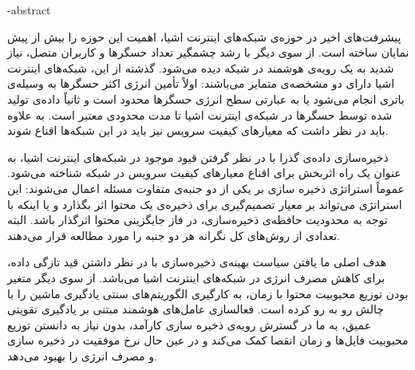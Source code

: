 \fa-abstract{
پیشرفت‌های اخیر در حوزه‌ی شبکه‌های اینترنت اشیا، اهمیت این حوزه را بیش از پیش نمایان ساخته است. از سوی دیگر با رشد چشمگیر تعداد حسگرها و کاربران متصل، نیاز شدید به یک رویه‌ی هوشمند در شبکه دیده می‌شود. گذشته از این، شبکه‌های اینترنت اشیا دارای دو مشخصه‌ی متمایز می‌باشند: اولاً تأمین انرژی اکثر حسگرها به وسیله‌ی باتری انجام می‌شود یا به عبارتی سطح انرژی حسگرها محدود است و ثانیاً داده‌ی تولید شده توسط حسگرها در شبکه‌ی اینترنت اشیا تا مدت محدودی معتبر است. به علاوه باید در نظر داشت که معیارهای کیفیت سرویس نیز باید در این شبکه‌ها اقناع شوند.

ذخیره‌سازی داده‌ی گذرا با در نظر گرفتن قیود موجود در شبکه‌های اینترنت اشیا، به عنوان یک راه اثربخش برای اقناع معیارهای کیفیت سرویس در شبکه شناخته می‌شود. عموماً استراتژی ذخیره سازی بر یکی از دو جنبه‌ی متفاوت مسئله‌ اعمال می‌شوند: این استراتژی می‌تواند بر معیار تصمیم‌گیری برای ذخیره‌ی یک محتوا اثر بگذارد و یا اینکه با توجه به محدودیت حافظه‌ی ذخیره‌سازی، در فاز جایگزینی محتوا اثرگذار باشد. البته تعدادی از روش‌های کل نگرانه هر دو جنبه را مورد مطالعه قرار می‌دهند. 

هدف اصلی ما یافتن سیاست بهینه‌ی ذخیره‌سازی با در نظر داشتن قید تازگی داده، برای کاهش مصرف انرژی در شبکه‌های اینترنت اشیا می‌باشد. از سوی دیگر متغیر بودن توزیع محبوبیت محتوا با زمان،  به کارگیری الگوریتم‌های سنتی یادگیری ماشین را با چالش رو به رو کرده است. فعالسازی عامل‌های هوشمند مبتنی بر یادگیری تقویتی عمیق، به ما در گسترش رویه‌ی ذخیره سازی کارآمد، بدون نیاز به دانستن توزیع محبوبیت فایل‌ها و زمان انقصا کمک می‌کند و در عین حال نرخ موفقیت در ذخیره سازی و مصرف انرژی را بهبود می‌دهد.
}
